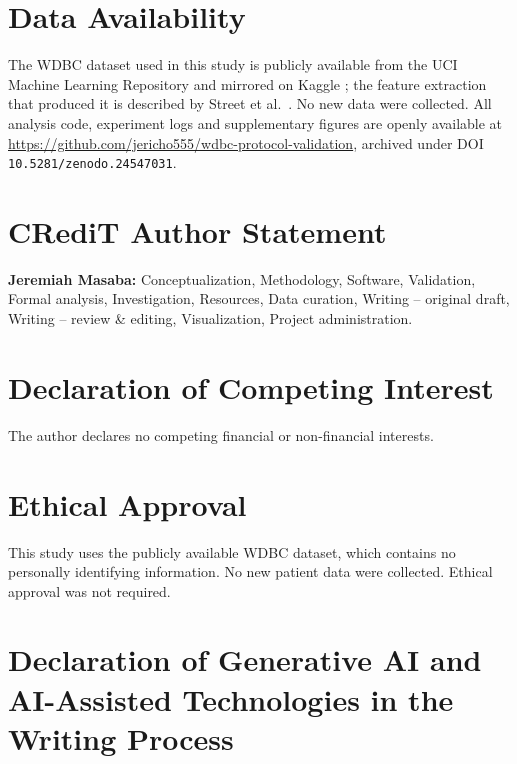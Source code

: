 \documentclass[review,12pt]{elsarticle}
\begin{document}
\section*{Data Availability}

The WDBC dataset used in this study is publicly available from the UCI Machine Learning Repository and mirrored on Kaggle \cite{kaggle2016wdbc}; the feature extraction that produced it is described by Street et al.\ \cite{street1993nuclear}. No new data were collected. All analysis code, experiment logs and supplementary figures are openly available at \url{https://github.com/jericho555/wdbc-protocol-validation}, archived under DOI \texttt{10.5281/zenodo.24547031}.

\section*{CRediT Author Statement}

\textbf{Jeremiah Masaba:} Conceptualization, Methodology, Software, Validation, Formal analysis, Investigation, Resources, Data curation, Writing -- original draft, Writing -- review \& editing, Visualization, Project administration.

\section*{Declaration of Competing Interest}

The author declares no competing financial or non-financial interests.

\section*{Ethical Approval}

This study uses the publicly available WDBC dataset, which contains no personally identifying information. No new patient data were collected. Ethical approval was not required.

\section*{Declaration of Generative AI and AI-Assisted Technologies in the Writing Process}
\end{document}
